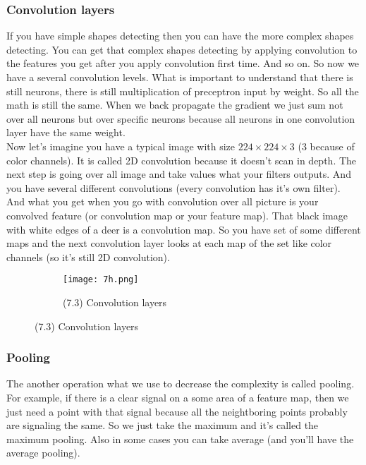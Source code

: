 \subsubsection*{Convolution layers}

If you have simple shapes detecting then you can have the more complex shapes detecting. You can get that complex shapes detecting by applying convolution to the features you get after you apply convolution first time. And so on. So now we have a several convolution levels. What is important to understand that there is still neurons, there is still multiplication of preceptron input by weight. So all the math is still the same. When we back propagate the gradient we just sum not over all neurons but over specific neurons because all neurons in one convolution layer have the same weight.\\
Now let's imagine you have a typical image with size $224\times224\times3$ (3 because of color channels). It is called 2D convolution because it doesn't scan in depth. The next step is going over all image and take values what your filters outputs. And you have several different convolutions (every convolution has it's own filter). And what you get when you go with convolution over all picture is your convolved feature (or convolution map or your feature map). That black image with white edges of a deer is a convolution map. So you have set of some different maps and the next convolution layer looks at each map of the set like color channels (so it's still 2D convolution).\\
\begin{figure}[h]
  \centering
  \begin{subfigure}[l]{0.6\linewidth}
    \texttt{[image: 7h.png]}
    \caption*{(7.3) Convolution layers}
  \end{subfigure}
\end{figure}

\vspace{-0.5cm}
\subsubsection*{Pooling}

The another operation what we use to decrease the complexity is called pooling. For example, if there is a clear signal on a some area of a feature map, then we just need a point with that signal because all the neightboring points probably are signaling the same. So we just take the maximum and it's called the maximum pooling. Also in some cases you can take average (and you'll have the average pooling).

